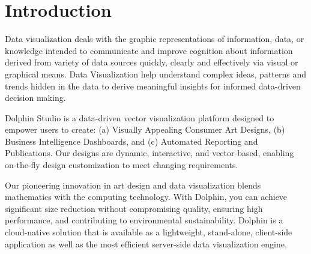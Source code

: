 \documentclass{amm-pst-report}
\title{\LARGE{\color{teal}{\textbf{Dolphin Studio: Publication Design and Automation}}}}
\author{Product Brochure\\\small{Version \version}}
\date{\vspace{-10mm}}
\begin{document}
\maketitles




\section{Introduction}
Data visualization deals with the graphic representations of information, data, or knowledge intended to communicate and improve cognition about information derived from variety of data sources quickly, clearly and effectively via visual or graphical means. Data Visualization help understand complex ideas, patterns and trends hidden in the data to derive meaningful insights for informed data-driven decision making.



Dolphin Studio is a data-driven vector visualization platform designed to empower users to create: (a) Visually Appealing Consumer Art Designs, (b) Business Intelligence Dashboards, and (c) Automated Reporting and Publications. Our designs are dynamic, interactive, and vector-based, enabling on-the-fly design customization to meet changing requirements.

Our pioneering innovation in art design and data visualization blends mathematics with the computing technology. With Dolphin, you can achieve significant size reduction without compromising quality, ensuring high performance, and contributing to environmental sustainability. Dolphin is a cloud-native solution that is available as a lightweight, stand-alone, client-side application as well as the most efficient server-side data visualization engine.
\end{document}
